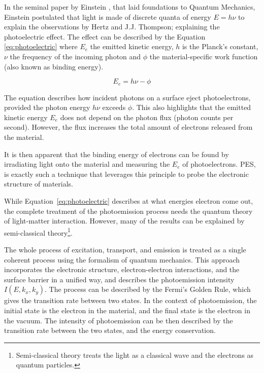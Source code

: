 In the seminal paper by Einstein \cite{einsteinUberErzeugungUnd1905}, that laid foundations to Quantum Mechanics, Einstein postulated that light is made of discrete quanta of energy $E = h\nu$ to explain the observations by Hertz and J.J. Thompson; explaining the photoelectric effect. The effect can be described by the Equation \ref{eq:photoelectric} where $E_e$ the emitted kinetic energy, $h$ is the Planck's constant, $\nu$ the frequency of the incoming photon and  $\phi$ the material-specific work function (also known as binding energy). 

\begin{equation}\label{eq:photoelectric}
    E_e = h\nu - \phi
\end{equation}

The equation describes how incident photons on a surface eject photoelectrons, provided the photon energy $h\nu$ exceeds $\phi$. This also highlights that the emitted kinetic energy $E_e$ does not depend on the photon flux (photon counts per second). However, the flux increases the total amount of electrons released from the material.

It is then apparent that the binding energy of electrons can be found by irradiating light onto the material and measuring the $E_e$ of photoelectrons. \gls{PES}, is exactly such a technique that leverages this principle to probe the electronic structure of materials.

While Equation~\ref{eq:photoelectric} describes at what energies electron come out, the complete treatment of the photoemission process needs the quantum theory of light-matter interaction. However, many of the results can be explained by semi-classical theory\footnote{Semi-classical theory treats the light as a classical wave and the electrons as quantum particles.}.

The whole process of excitation, transport, and emission is treated as a single coherent process using the formalism of quantum mechanics. This approach incorporates the electronic structure, electron-electron interactions, and the surface barrier in a unified way, and describes the photoemission intensity  $I(E, k_x, k_y)$. The process can be described by the Fermi's Golden Rule, which gives the transition rate between two states. In the context of photoemission, the initial state is the electron in the material, and the final state is the electron in the vacuum. The intensity of photoemission can be then described by the transition rate between the two states, and the energy conservation.

